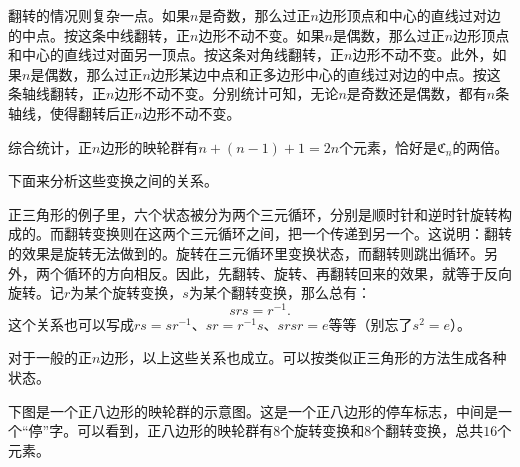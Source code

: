 \documentclass[12pt,UTF8,fontset=none]{ctexbook}
\begin{document}
翻转的情况则复杂一点。如果$n$是奇数，那么过正$n$边形顶点和中心的直线过对边的中点。按这条中线翻转，正$n$边形不动不变。如果$n$是偶数，那么过正$n$边形顶点和中心的直线过对面另一顶点。按这条对角线翻转，正$n$边形不动不变。此外，如果$n$是偶数，那么过正$n$边形某边中点和正多边形中心的直线过对边的中点。按这条轴线翻转，正$n$边形不动不变。分别统计可知，无论$n$是奇数还是偶数，都有$n$条轴线，使得翻转后正$n$边形不动不变。

综合统计，正$n$边形的映轮群有$n+(n-1)+1=2n$个元素，恰好是$\mathfrak{C}_n$的两倍。

下面来分析这些变换之间的关系。

正三角形的例子里，六个状态被分为两个三元循环，分别是顺时针和逆时针旋转构成的。而翻转变换则在这两个三元循环之间，把一个传递到另一个。这说明：翻转的效果是旋转无法做到的。旋转在三元循环里变换状态，而翻转则跳出循环。另外，两个循环的方向相反。因此，先翻转、旋转、再翻转回来的效果，就等于反向旋转。记$r$为某个旋转变换，$s$为某个翻转变换，那么总有：
$$ srs = r^{-1}. $$
这个关系也可以写成$rs = sr^{-1}$、$sr = r^{-1}s$、$srsr = e$等等（别忘了$s^2 = e$）。

对于一般的正$n$边形，以上这些关系也成立。可以按类似正三角形的方法生成各种状态。

下图是一个正八边形的映轮群的示意图。这是一个正八边形的停车标志，中间是一个“停”字。可以看到，正八边形的映轮群有$8$个旋转变换和$8$个翻转变换，总共$16$个元素。
\end{document}
